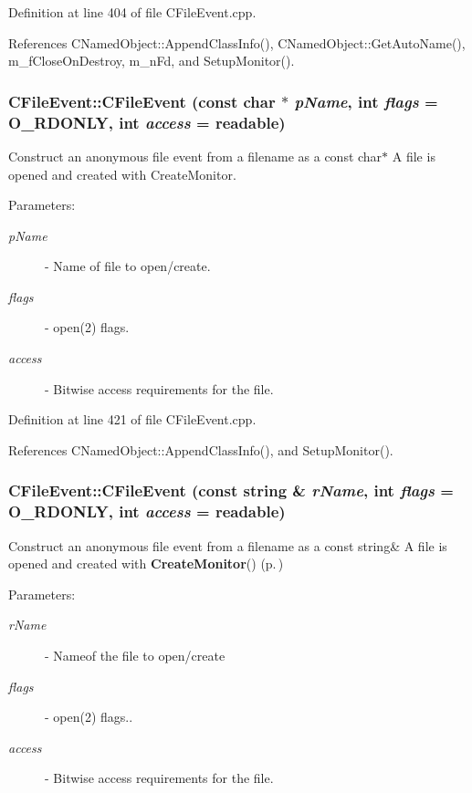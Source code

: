 Definition at line 404 of file CFile\-Event.cpp.

References CNamed\-Object::Append\-Class\-Info(), CNamed\-Object::Get\-Auto\-Name(), m\_\-f\-Close\-On\-Destroy, m\_\-n\-Fd, and Setup\-Monitor().
\subsubsection{\setlength{\rightskip}{0pt plus 5cm}CFile\-Event::CFile\-Event (const char $\ast$ {\em p\-Name}, int {\em flags} = O\_\-RDONLY, int {\em access} = {\bf readable})}\label{classCFileEvent_a1}


Construct an anonymous file event from a filename as a const char$\ast$ A file is opened and created with Create\-Monitor. \begin{Desc}
\item[Parameters: ]\par
\begin{description}
\item[{\em 
p\-Name}]- Name of file to open/create. \item[{\em 
flags}]- open(2) flags. \item[{\em 
access}]- Bitwise access requirements for the file. \end{description}
\end{Desc}


Definition at line 421 of file CFile\-Event.cpp.

References CNamed\-Object::Append\-Class\-Info(), and Setup\-Monitor().
\subsubsection{\setlength{\rightskip}{0pt plus 5cm}CFile\-Event::CFile\-Event (const string \& {\em r\-Name}, int {\em flags} = O\_\-RDONLY, int {\em access} = {\bf readable})}\label{classCFileEvent_a2}


Construct an anonymous file event from a filename as a const string\& A file is opened and created with {\bf Create\-Monitor}() {\rm (p.\,\pageref{classCFileEvent_b2})} \begin{Desc}
\item[Parameters: ]\par
\begin{description}
\item[{\em 
r\-Name}]- Nameof the file to open/create \item[{\em 
flags}]- open(2) flags.. \item[{\em 
access}]- Bitwise access requirements for the file. \end{description}
\end{Desc}



